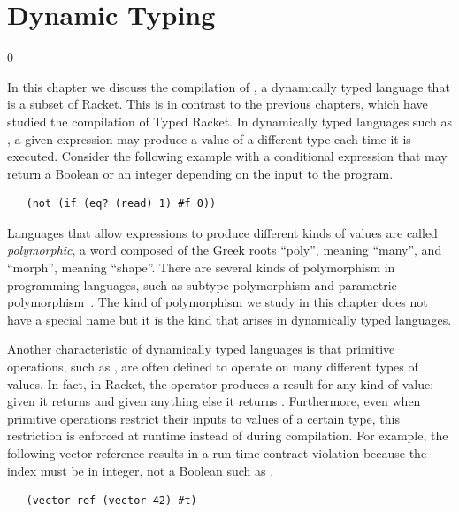 \documentclass[7x10]{TimesAPriori_MIT}%
\def\racketEd{0}
\def\edition{1}
\begin{document}
\chapter{Dynamic Typing}
\label{ch:Rdyn}

\if\edition\racketEd

In this chapter we discuss the compilation of \LangDyn{}, a dynamically
typed language that is a subset of Racket. This is in contrast to the
previous chapters, which have studied the compilation of Typed
Racket. In dynamically typed languages such as \LangDyn{}, a given
expression may produce a value of a different type each time it is
executed. Consider the following example with a conditional 
expression that may return a Boolean or an integer depending on the
input to the program.
\begin{lstlisting}
   (not (if (eq? (read) 1) #f 0))
\end{lstlisting}
Languages that allow expressions to produce different kinds of values
are called \emph{polymorphic}, a word composed of the Greek roots
``poly'', meaning ``many'', and ``morph'', meaning ``shape''.  There
are several kinds of polymorphism in programming languages, such as
subtype polymorphism and parametric
polymorphism~\citep{Cardelli:1985kx}. The kind of polymorphism we
study in this chapter does not have a special name but it is the kind
that arises in dynamically typed languages.

Another characteristic of dynamically typed languages is that
primitive operations, such as , are often defined to operate
on many different types of values. In fact, in Racket, the 
operator produces a result for any kind of value: given  it
returns  and given anything else it returns .
Furthermore, even when primitive operations restrict their inputs to
values of a certain type, this restriction is enforced at runtime
instead of during compilation. For example, the following vector
reference results in a run-time contract violation because the index
must be in integer, not a Boolean such as .
\begin{lstlisting}
   (vector-ref (vector 42) #t)
\end{lstlisting}
\end{document}
